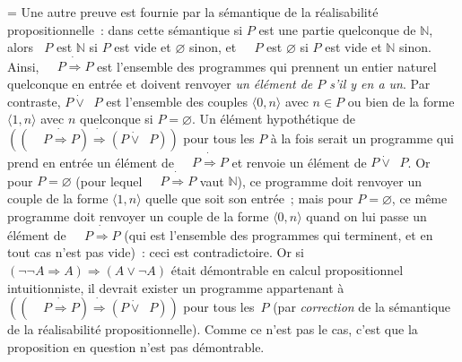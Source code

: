 \documentclass[12pt,a4paper]{article}
\theoremstyle{definition}
\newcommand{\dottedlimp}{\mathbin{\dot\Rightarrow}}
\newcommand{\dottedlor}{\mathbin{\dot\lor}}
\newcommand{\dottedneg}{\mathop{\dot\neg}}
\newif\ifcorrige
\newenvironment{corrige}%
{\ifcorrige\relax\else\setbox0=\vbox\bgroup\fi%
\smallbreak\footnotesize\noindent{\underbar{\textit{Corrigé.}}\quad}}
{{\hbox{}\nobreak\hfill\checkmark}%
\ifcorrige\relax\else\egroup\fi\par}
\begin{document}
\begin{corrige}
Une autre preuve est fournie par la sémantique de la réalisabilité
propositionnelle : dans cette sémantique si $P$ est une partie
quelconque de $\mathbb{N}$, alors $\dottedneg P$ est $\mathbb{N}$ si
$P$ est vide et $\varnothing$ sinon, et $\dottedneg\dottedneg P$ est
$\varnothing$ si $P$ est vide et $\mathbb{N}$ sinon.  Ainsi,
$\dottedneg\dottedneg P \dottedlimp P$ est l'ensemble des programmes
qui prennent un entier naturel quelconque en entrée et doivent
renvoyer \emph{un élément de $P$ s'il y en a un}.  Par contraste, $P
\dottedlor \dottedneg P$ est l'ensemble des couples $\langle
0,n\rangle$ avec $n\in P$ ou bien de la forme $\langle 1,n\rangle$
avec $n$ quelconque si $P=\varnothing$.  Un élément hypothétique de
$((\dottedneg\dottedneg P \dottedlimp P) \dottedlimp (P \dottedlor
\dottedneg P))$ pour tous les $P$ à la fois serait un programme qui
prend en entrée un élément de $\dottedneg\dottedneg P \dottedlimp P$
et renvoie un élément de $P \dottedlor \dottedneg P$.  Or pour $P =
\varnothing$ (pour lequel $\dottedneg\dottedneg P \dottedlimp P$ vaut
$\mathbb{N}$), ce programme doit renvoyer un couple de la forme
$\langle 1,n\rangle$ quelle que soit son entrée ; mais pour $P =
\varnothing$, ce même programme doit renvoyer un couple de la forme
$\langle 0,n\rangle$ quand on lui passe un élément de
$\dottedneg\dottedneg P \dottedlimp P$ (qui est l'ensemble des
programmes qui terminent, et en tout cas n'est pas vide) : ceci est
contradictoire.  Or si $(\neg\neg A \Rightarrow A) \Rightarrow (A \lor
\neg A)$ était démontrable en calcul propositionnel intuitionniste, il
devrait exister un programme appartenant à $((\dottedneg\dottedneg P
\dottedlimp P) \dottedlimp (P \dottedlor \dottedneg P))$ pour tous
les $P$ (par \emph{correction} de la sémantique de la réalisabilité
propositionnelle).  Comme ce n'est pas le cas, c'est que la
proposition en question n'est pas démontrable.


\end{corrige}
\end{document}
